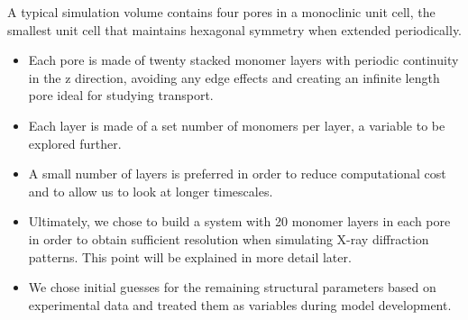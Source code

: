 \documentclass{article}
\begin{document}
  A typical simulation volume contains four pores in a monoclinic unit cell,
  the smallest unit cell that maintains hexagonal symmetry when extended 
  periodically.
  \begin{itemize}
    \item Each pore is made of twenty stacked monomer layers with periodic 
    continuity in the z direction, avoiding any edge effects and creating an 
    infinite length pore ideal for studying transport.
    \item Each layer is made of a set number of monomers per layer, a variable to
    be explored further.
    \item A small number of layers is preferred in order to reduce computational
    cost and to allow us to look at longer timescales.
    \item Ultimately, we chose to build a system with 20 monomer layers in each pore
    in order to obtain sufficient resolution when simulating X-ray diffraction patterns.
    This point will be explained in more detail later.
    \item We chose initial guesses for the remaining structural parameters based on
    experimental data and treated them as variables during model development.
  \end{itemize}
 
\end{document}
